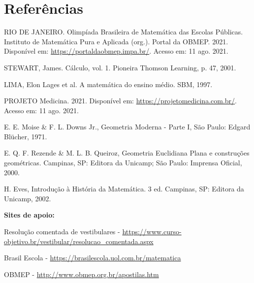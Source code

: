 \documentclass[12pt]{article}
\newcommand{\sectionauthor}{Autor da Seção}
\newcommand{\sectionclass}{Disciplina}
\begin{document}
    
    \renewcommand{\sectionclass}{Matemática}

    

    \renewcommand{\sectionauthor}{}
    
    \pagestyle{fancy}
    
    
    

    
    

    

    \section{Referências}
    \fontsize{10}{10}
    \selectfont
    \noindent
    RIO DE JANEIRO. Olimpíada Brasileira de Matemática das Escolas Públicas. 
    Instituto de Matemática Pura e Aplicada (org.). Portal da OBMEP. 2021. Disponível em: \url{https://portaldaobmep.impa.br/}. Acesso em: 11 ago. 2021.
    
    \noindent
    STEWART, James. Cálculo, vol. 1. Pioneira Thomson Learning, p. 47, 2001.

    \noindent
    LIMA, Elon Lages et al. A matemática do ensino médio. SBM, 1997.

    \noindent
    PROJETO Medicina. 2021. Disponível em: \url{https://projetomedicina.com.br/}. Acesso em: 11 ago. 2021.

    \noindent
    E. E. Moise \& F. L. Downs Jr., Geometria Moderna - Parte I, São Paulo: Edgard Blücher, 1971.

    \noindent
    E.  Q.  F.  Rezende  \&  M.  L.  B.  Queiroz,  Geometria  Euclidiana  Plana  e  construções  geométricas. 
    Campinas, SP: Editora da Unicamp; São Paulo: Imprensa Oficial, 2000.

    \noindent
    H. Eves, Introdução à História da Matemática. 3 ed. Campinas, SP: Editora da Unicamp, 2002.

    \noindent
    \textbf{Sites de apoio:}

    \noindent
    Resolução comentada de vestibulares - \url{https://www.curso-objetivo.br/vestibular/resolucao_comentada.aspx}

    \noindent
    Brasil Escola - \url{https://brasilescola.uol.com.br/matematica}

    \noindent
    OBMEP - \url{http://www.obmep.org.br/apostilas.htm}
\end{document}

